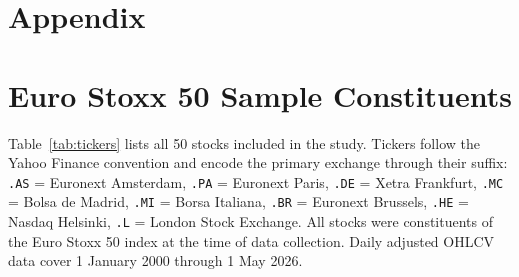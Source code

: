 

\section*{Appendix}

\appendix
\renewcommand{\thesection}{\Alph{section}}
\setcounter{section}{0}

\section{Euro Stoxx 50 Sample Constituents}
\label{app:tickers}

Table~\ref{tab:tickers} lists all 50 stocks included in the study. Tickers follow the Yahoo Finance convention and encode the primary exchange through their suffix: \texttt{.AS} = Euronext Amsterdam, \texttt{.PA} = Euronext Paris, \texttt{.DE} = Xetra Frankfurt, \texttt{.MC} = Bolsa de Madrid, \texttt{.MI} = Borsa Italiana, \texttt{.BR} = Euronext Brussels, \texttt{.HE} = Nasdaq Helsinki, \texttt{.L} = London Stock Exchange. All stocks were constituents of the Euro Stoxx 50 index at the time of data collection. Daily adjusted OHLCV data cover 1 January 2000 through 1 May 2026.

